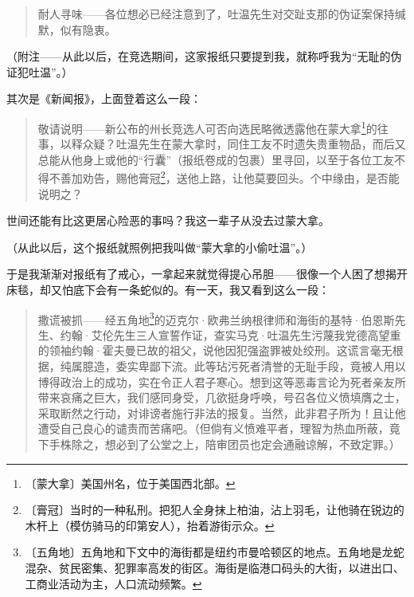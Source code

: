 \documentclass[12pt,UTF-8,openany]{ctexbook}
\begin{document}
\begin{large}
    \begin{quotation}
    
    耐人寻味——各位想必已经注意到了，吐温先生对交趾支那的伪证案保持缄默，似有隐衷。
    
    \end{quotation}
    
    （附注——从此以后，在竞选期间，这家报纸只要提到我，就称呼我为“无耻的伪证犯吐温”。）
    
    其次是《新闻报》，上面登着这么一段：
    
    \begin{quotation}
    
    敬请说明——新公布的州长竞选人可否向选民略微透露他在蒙大拿\footnote{〔蒙大拿〕美国州名，位于美国西北部。}的往事，以释众疑？吐温先生在蒙大拿时，同住工友不时遗失贵重物品，而后又总能从他身上或他的“行囊”（报纸卷成的包裹）里寻回，以至于各位工友不得不善加劝告，赐他膏冠\footnote{〔膏冠〕当时的一种私刑。把犯人全身抹上柏油，沾上羽毛，让他骑在锐边的木杆上（模仿骑马的印第安人），抬着游街示众。}，送他上路，让他莫要回头。个中缘由，是否能说明之？
    
    \end{quotation}
    
    世间还能有比这更居心险恶的事吗？我这一辈子从没去过蒙大拿。
    
    （从此以后，这个报纸就照例把我叫做“蒙大拿的小偷吐温”。）
    
    于是我渐渐对报纸有了戒心，一拿起来就觉得提心吊胆——很像一个人困了想揭开床毯，却又怕底下会有一条蛇似的。有一天，我又看到这么一段：
    
    \begin{quotation}
    
    撒谎被抓——经五角地\footnote{〔五角地〕五角地和下文中的海街都是纽约市曼哈顿区的地点。五角地是龙蛇混杂、贫民密集、犯罪率高发的街区。海街是临港口码头的大街，以进出口、工商业活动为主，人口流动频繁。}的迈克尔·欧弗兰纳根律师和海街的基特·伯恩斯先生、约翰·艾伦先生三人宣誓作证，查实马克·吐温先生污蔑我党德高望重的领袖约翰·霍夫曼已故的祖父，说他因犯强盗罪被处绞刑。这谎言毫无根据，纯属臆造，委实卑鄙下流。此等玷污死者清誉的无耻手段，竟被人用以博得政治上的成功，实在令正人君子寒心。想到这等恶毒言论为死者亲友所带来哀痛之巨大，我们感同身受，几欲挺身呼唤，号召各位义愤填膺之士，采取断然之行动，对诽谤者施行非法的报复。当然，此非君子所为！且让他遭受自己良心的谴责而苦痛吧。（但倘有义愤难平者，理智为热血所蔽，竟下手株除之，想必到了公堂之上，陪审团员也定会通融谅解，不致定罪。）
    
    \end{quotation}
    

\end{large}
\end{document}

